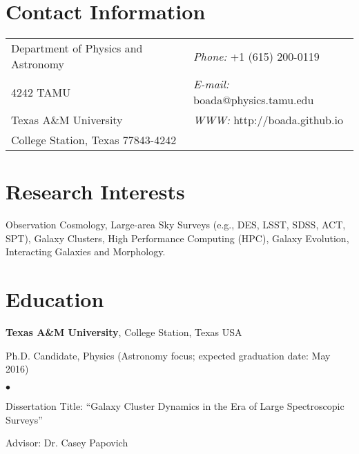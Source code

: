 \documentclass[margin,line, 11pt]{Boada_res}
\newenvironment{list1}{
  \begin{list}{\ding{113}}{%
      \setlength{\itemsep}{0in}
      \setlength{\parsep}{0in} \setlength{\parskip}{0in}
      \setlength{\topsep}{0in} \setlength{\partopsep}{0in} 
      \setlength{\leftmargin}{0.17in}}}{\end{list}}
\newenvironment{list2}{
  \begin{list}{$\bullet$}{%
      \setlength{\itemsep}{0in}
      \setlength{\parsep}{0in} \setlength{\parskip}{0in}
      \setlength{\topsep}{0in} \setlength{\partopsep}{0in} 
      \setlength{\leftmargin}{0.2in}}}{\end{list}}
\begin{document}

\begin{resume}
\section{\sc Contact Information}
\vspace{.05in}
\begin{tabular}{@{}p{3in}p{3in}}
Department of Physics and Astronomy & {\it Phone:}  +1 (615) 200-0119 \\            
4242 TAMU   & {\it E-mail:}  boada@physics.tamu.edu \\         
Texas A\&M University & {\it WWW:} http://boada.github.io \\       
College Station, Texas 77843-4242  & \\     
\end{tabular}

\section{\sc Research Interests}
Observation Cosmology, Large-area Sky Surveys (e.g., DES, LSST, SDSS, ACT, SPT), Galaxy Clusters, High Performance Computing (HPC), Galaxy Evolution, Interacting Galaxies and Morphology.
\vspace*{-3mm}

\section{\sc Education}
\textbf{Texas A\&M University}, College Station, Texas USA\\
\vspace*{-.1in}
\begin{list1}
    \item[]Ph.D. Candidate, Physics (Astronomy focus; expected graduation date: May 2016)
    \begin{list2}
        \item Dissertation Title: ``Galaxy Cluster Dynamics in the Era of Large Spectroscopic\\ Surveys'' 
        \item Advisor: Dr. Casey Papovich
    \end{list2}
\end{list1}
\vspace*{-3mm}


\end{resume}
\end{document}
